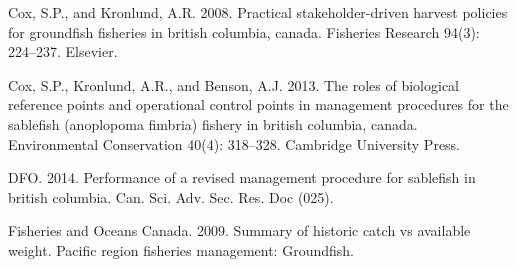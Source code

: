 \documentclass[11pt]{book}
\begin{document}
\leavevmode\hypertarget{ref-cox2008practical}{}%
Cox, S.P., and Kronlund, A.R. 2008. Practical stakeholder-driven harvest policies for groundfish fisheries in british columbia, canada. Fisheries Research 94(3): 224--237. Elsevier.

\leavevmode\hypertarget{ref-cox2013roles}{}%
Cox, S.P., Kronlund, A.R., and Benson, A.J. 2013. The roles of biological reference points and operational control points in management procedures for the sablefish (anoplopoma fimbria) fishery in british columbia, canada. Environmental Conservation 40(4): 318--328. Cambridge University Press.

\leavevmode\hypertarget{ref-dfo2014performanc}{}%
DFO. 2014. Performance of a revised management procedure for sablefish in british columbia. Can. Sci. Adv. Sec. Res. Doc (025).

\leavevmode\hypertarget{ref-DFO2009}{}%
Fisheries and Oceans Canada. 2009. Summary of historic catch vs available weight. Pacific region fisheries management: Groundfish.

\MakeAvailable
\end{document}
